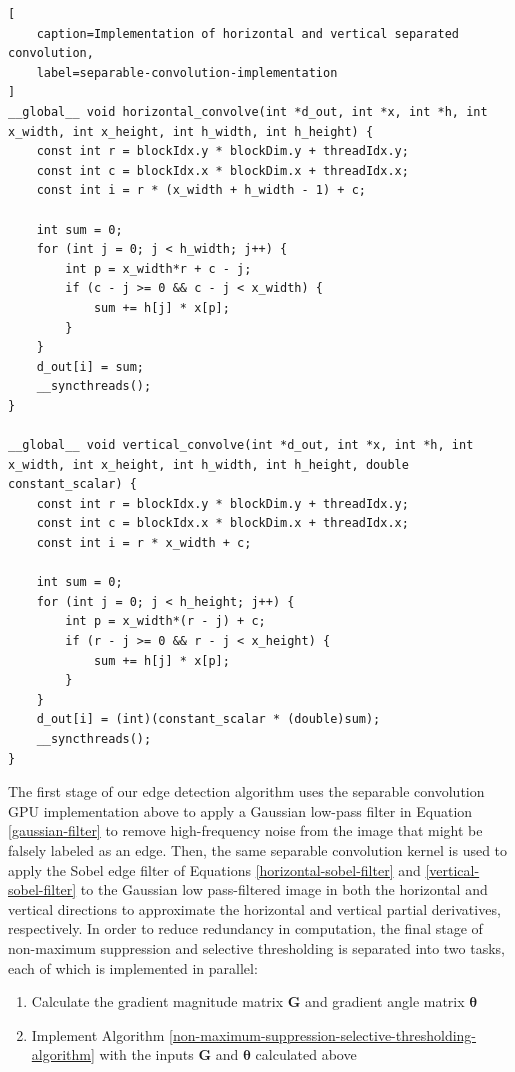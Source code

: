 \documentclass[journal]{IEEEtran}
\begin{document}
\begin{lstlisting}[
	caption=Implementation of horizontal and vertical separated convolution,
	label=separable-convolution-implementation
]
__global__ void horizontal_convolve(int *d_out, int *x, int *h, int x_width, int x_height, int h_width, int h_height) {
    const int r = blockIdx.y * blockDim.y + threadIdx.y;
    const int c = blockIdx.x * blockDim.x + threadIdx.x;
    const int i = r * (x_width + h_width - 1) + c;
    
    int sum = 0;
    for (int j = 0; j < h_width; j++) {
        int p = x_width*r + c - j;
        if (c - j >= 0 && c - j < x_width) {
            sum += h[j] * x[p];
        }
    }
    d_out[i] = sum;
    __syncthreads();
}

__global__ void vertical_convolve(int *d_out, int *x, int *h, int x_width, int x_height, int h_width, int h_height, double constant_scalar) {
	const int r = blockIdx.y * blockDim.y + threadIdx.y;
	const int c = blockIdx.x * blockDim.x + threadIdx.x;
	const int i = r * x_width + c;

    int sum = 0;
    for (int j = 0; j < h_height; j++) {
        int p = x_width*(r - j) + c;
        if (r - j >= 0 && r - j < x_height) {
            sum += h[j] * x[p];
        }
    }
    d_out[i] = (int)(constant_scalar * (double)sum);
    __syncthreads();
}
\end{lstlisting}
\par The first stage of our edge detection algorithm uses the separable convolution GPU implementation above to apply a Gaussian low-pass filter in Equation \ref{gaussian-filter} to remove high-frequency noise from the image that might be falsely labeled as an edge. Then, the same separable convolution kernel is used to apply the Sobel edge filter of Equations \ref{horizontal-sobel-filter} and \ref{vertical-sobel-filter} to the Gaussian low pass-filtered image in both the horizontal and vertical directions to approximate the horizontal and vertical partial derivatives, respectively. In order to reduce redundancy in computation, the final stage of non-maximum suppression and selective thresholding is separated into two tasks, each of which is implemented in parallel:
\begin{enumerate}
	\item Calculate the gradient magnitude matrix $\boldsymbol{G}$ and gradient angle matrix $\boldsymbol{\theta}$
	\item Implement Algorithm \ref{non-maximum-suppression-selective-thresholding-algorithm} with the inputs $\boldsymbol{G}$ and $\boldsymbol{\theta}$ calculated above
\end{enumerate}
\end{document}
